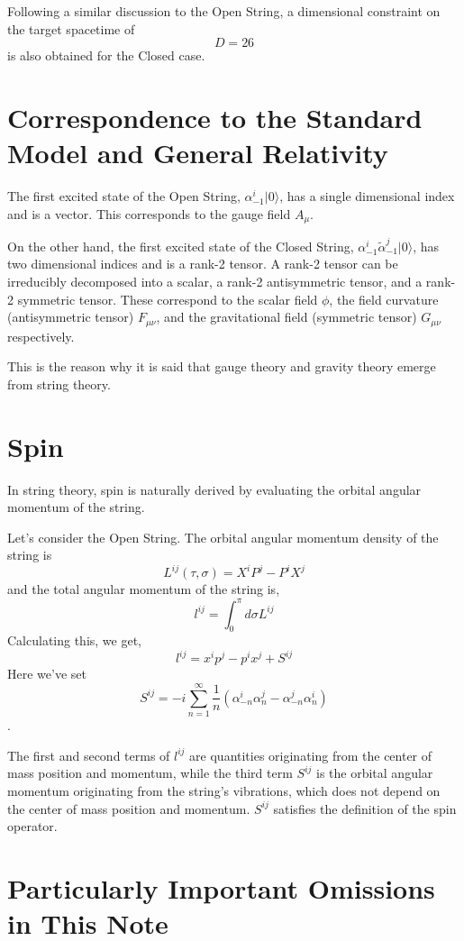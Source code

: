 \documentclass[uplatex]{jsarticle}
\begin{document}
Following a similar discussion to the Open String, a dimensional constraint on the target spacetime of
$$
	D=26
$$
is also obtained for the Closed case.

\section{Correspondence to the Standard Model and General Relativity}

The first excited state of the Open String,
$
	\alpha^{i}_{-1}
	| 0 \rangle
$,
has a single dimensional index and is a vector. This corresponds to the
gauge field
$A_{\mu}$.


On the other hand, the first excited state of the Closed String,
$
	\alpha^{i}_{-1}
	\tilde{\alpha}^{j}_{-1}
	| 0 \rangle
$,
has two dimensional indices and is a rank-2 tensor.
A rank-2 tensor can be irreducibly decomposed into a scalar, a rank-2 antisymmetric tensor, and a rank-2 symmetric tensor.
These correspond to the scalar field $\phi$, the field curvature (antisymmetric tensor) $F_{\mu \nu}$, and the gravitational field (symmetric tensor) $G_{\mu \nu}$ respectively.

This is the reason why it is said that gauge theory and gravity theory emerge from string theory.

\section{Spin}

In string theory, spin is naturally derived by evaluating the orbital angular momentum of the string.

Let's consider the Open String.
The orbital angular momentum density of the string is
$$
	L^{ij}(\tau, \sigma)
	=
	X^{i} P^{j}
	-
	P^{i} X^{j}
$$
and the total angular momentum of the string is,
$$
	l^{ij}
	=
	\int^{\pi}_{0} d \sigma
	L^{ij}
$$
Calculating this, we get,
$$
	l^{ij}
	=
	x^{i} p^{j}
	-
	p^{i} x^{j}
	+
	S^{ij}
$$
Here we've set
$$
	S^{ij}
	=
	-i \sum_{n=1}^{\infty} \frac{1}{n}
	(
	\alpha^{i}_{-n} \alpha^{j}_{n}
	-
	\alpha^{j}_{-n} \alpha^{i}_{n}
	)
$$
.

The first and second terms of
$l^{ij}$
are quantities originating from the center of mass position and momentum, while the third term
$S^{ij}$
is the orbital angular momentum originating from the string's vibrations, which does not depend on the center of mass position and momentum.
$S^{ij}$
satisfies the definition of the spin operator.

\section{Particularly Important Omissions in This Note}
\end{document}
